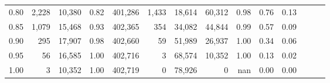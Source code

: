 \begin{tabular}{rrrrrrrrrrrrrr}
0.80 &   2,228 &  10,380 &  0.82 &  401,286 &    1,433 &  18,614 &  60,312 &  0.98 &  0.76 &      0.13 \\
0.85 &   1,079 &  15,468 &  0.93 &  402,365 &      354 &  34,082 &  44,844 &  0.99 &  0.57 &      0.09 \\
0.90 &     295 &  17,907 &  0.98 &  402,660 &       59 &  51,989 &  26,937 &  1.00 &  0.34 &      0.06 \\
0.95 &      56 &  16,585 &  1.00 &  402,716 &        3 &  68,574 &  10,352 &  1.00 &  0.13 &      0.02 \\
1.00 &       3 &  10,352 &  1.00 &  402,719 &        0 &  78,926 &       0 &   nan &  0.00 &      0.00 \\
\bottomrule
\end{tabular}
